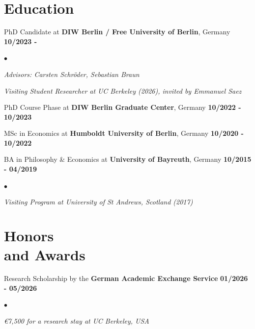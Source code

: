 \documentclass[margin, line]{res}
\newlength{\secvspace}
\newlength{\linevspace}
\newlength{\listvspace}
\newenvironment{list2}{
  \begin{list}{$\bullet$}{%
      \setlength{\itemsep}{0in}
      \setlength{\parsep}{0in} \setlength{\parskip}{0in}
      \setlength{\topsep}{0in} \setlength{\partopsep}{0in}
      \setlength{\leftmargin}{0.2in}}}{\end{list}}
\begin{document}
\begin{resume}
\section{Education}
PhD Candidate at {\bf DIW Berlin / Free University of Berlin}, Germany \hfill{\bf 10/2023 - \hspace{1.35cm}} \\
\vspace*{\listvspace}
\begin{list2}
\item[] \textit{Advisors:  Carsten Schröder, Sebastian Braun}
\item[] \textit{Visiting Student Researcher at UC Berkeley (2026), invited by Emmanuel Saez}
\end{list2}
\vspace{\listvspace}

PhD Course Phase at {\bf DIW Berlin Graduate Center}, Germany \hfill{\bf 10/2022 - 10/2023} \\
\vspace{\linevspace}

MSc in Economics at {\bf Humboldt University of Berlin}, Germany \hfill{\bf 10/2020 - 10/2022}\\
\vspace{\linevspace}

BA in Philosophy \& Economics at {\bf University of Bayreuth}, Germany \hfill{\bf 10/2015 - 04/2019}\\
\vspace*{\listvspace}
\begin{list2}
\item[] \textit{Visiting Program at University of St Andrews, Scotland (2017)}
\end{list2}
\vspace{\secvspace} %

\section{ Honors \\ and Awards}
Research Scholarship by the \textbf{German Academic Exchange Service} \hfill{\bf 01/2026 - 05/2026}\\
\vspace*{\listvspace}
\begin{list2}
    \item[] \textit{\euro 7,500 for a research stay at UC Berkeley, USA}
\end{list2}
\vspace*{\listvspace}


\end{resume}
\end{document}
